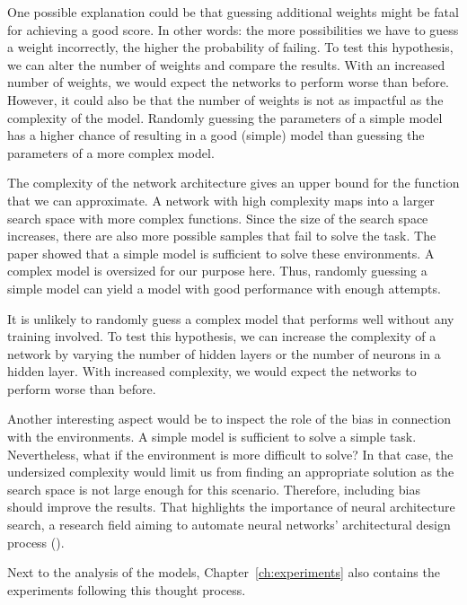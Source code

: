 One possible explanation could be that guessing additional weights might be fatal for achieving a good score. In other words: the more possibilities we have to guess a weight incorrectly, the higher the probability of failing. To test this hypothesis, we can alter the number of weights and compare the results. With an increased number of weights, we would expect the networks to perform worse than before. However, it could also be that the number of weights is not as impactful as the complexity of the model. Randomly guessing the parameters of a simple model has a higher chance of resulting in a good (simple) model than guessing the parameters of a more complex model.

The complexity of the network architecture gives an upper bound for the function that we can approximate. A network with high complexity maps into a larger search space with more complex functions. Since the size of the search space increases, there are also more possible samples that fail to solve the task. The paper showed that a simple model is sufficient to solve these environments. A complex model is oversized for our purpose here. Thus, randomly guessing a simple model can yield a model with good performance with enough attempts.

It is unlikely to randomly guess a complex model that performs well without any training involved. To test this hypothesis, we can increase the complexity of a network by varying the number of hidden layers or the number of neurons in a hidden layer. With increased complexity, we would expect the networks to perform worse than before.

Another interesting aspect would be to inspect the role of the bias in connection with the environments. A simple model is sufficient to solve a simple task. Nevertheless, what if the environment is more difficult to solve? In that case, the undersized complexity would limit us from finding an appropriate solution as the search space is not large enough for this scenario. Therefore, including bias should improve the results. That highlights the importance of neural architecture search, a research field aiming to automate neural networks' architectural design process (\cite{DBLP:journals/corr/abs-2005-11074}).

Next to the analysis of the models, Chapter~\ref{ch:experiments} also contains the experiments following this thought process.

